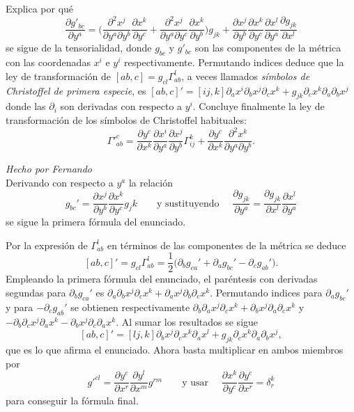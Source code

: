 \begin{problem}[9]Explica por qué 
	\[
	\dfrac{\partial g'_{bc}}{\partial y^a}=
	\Big(
	\dfrac{\partial^2x^j}{\partial y^a\partial y^b}
	\dfrac{\partial x^k}{\partial y^c}
	+\dfrac{\partial^2x^j}{\partial y^a\partial y^c}
	\dfrac{\partial x^k}{\partial y^b}
	\Big)
	g_{jk}
	+
	\dfrac{\partial x^j}{\partial y^b}
	\dfrac{\partial x^k}{\partial y^c}
	\dfrac{\partial x^l}{\partial y^a}
	\dfrac{\partial g_{jk}}{\partial x^l}
	\]
	se sigue de la tensorialidad, donde $g_{bc}$ y $g'_{bc}$ son las componentes de la métrica con las coordenadas $x^i$ e $y^i$ respectivamente.  Permutando indices deduce que la ley de transformación de 
	$[ab,c]=g_{cl}\Gamma_{ab}^l$, a veces llamados \emph{símbolos de Christoffel de primera especie}, 
	es
	$[ab,c]'=[ij,k]
	\partial_ax^i
	\partial_bx^j
	\partial_cx^k
	+g_{jk}\partial_c x^k\partial_a\partial_b x^j$
	donde las $\partial_i$ son derivadas con respecto a $y^i$. 
	Concluye finalmente la ley de transformación
	de los símbolos de Christoffel habituales:
	\[
	{\Gamma'}_{ab}^c=
	\frac{\partial y^c}{\partial x^k}
	\frac{\partial x^i}{\partial y^a}
	\frac{\partial x^j}{\partial y^b}
	\Gamma_{ij}^k+
	\frac{\partial y^c}{\partial x^k}
	\frac{\partial^2x^k}{\partial y^a\partial y^b}.
	\]
	
	
	
	\solution\textit{Hecho por Fernando}\\Derivando con respecto a $y^a$ la relación
	\[
	g_{bc}'=
	\frac{\partial x^j}{\partial y^b}
	\frac{\partial x^k}{\partial y^c}
	g_jk
	\qquad\text{y sustituyendo }\quad
	\frac{\partial g_{jk}}{\partial y^a}
	=
	\frac{\partial g_{jk}}{\partial x^l}
	\frac{\partial x^l}{\partial y^a}
	\]
	se sigue la primera fórmula del enunciado. 
	
	Por la expresión de $\Gamma_{ab}^l$ en términos de las componentes de la métrica se deduce
	\[
	[ab,c]'=g_{cl}\Gamma_{ab}^l
	=
	\frac{1}{2}
	\big(
	\partial_b g_{ca}'
	+\partial_a g_{bc}'
	-\partial_c g_{ab}'
	\big).
	\]
	Empleando la primera fórmula del enunciado, el paréntesis con derivadas segundas para $\partial_b g_{ca}'$ es $\partial_a\partial_b x^j\partial_cx^k+\partial_a x^j\partial_b\partial_cx^k$. Permutando indices para 
	$\partial_a g_{bc}'$
	y para $-\partial_c g_{ab}'$ se obtienen respectivamente
	$\partial_b\partial_a x^j\partial_cx^k+\partial_b x^j\partial_a\partial_cx^k$
	y
	$-\partial_b\partial_c x^j\partial_ax^k-\partial_b x^j\partial_c\partial_ax^k$. 
	Al sumar los resultados se sigue
	\[
	[ab,c]'=[lj,k]
	\partial_bx^j
	\partial_cx^k
	\partial_ax^l
	+g_{jk}\partial_c x^k\partial_a\partial_b x^j,
	\]
	que es lo que afirma el enunciado. Ahora basta multiplicar en ambos miembros por
	\[
	g'^{cl}
	=
	\frac{\partial y^c}{\partial x^r}
	\frac{\partial y^l}{\partial x^m}
	g^{rm}
	\qquad\text{y usar }\quad
	\frac{\partial x^k}{\partial y^c}
	\frac{\partial y^c}{\partial x^r}
	=\delta_r^k
	\]
	para conseguir la fórmula final. 
	
	
\end{problem}
